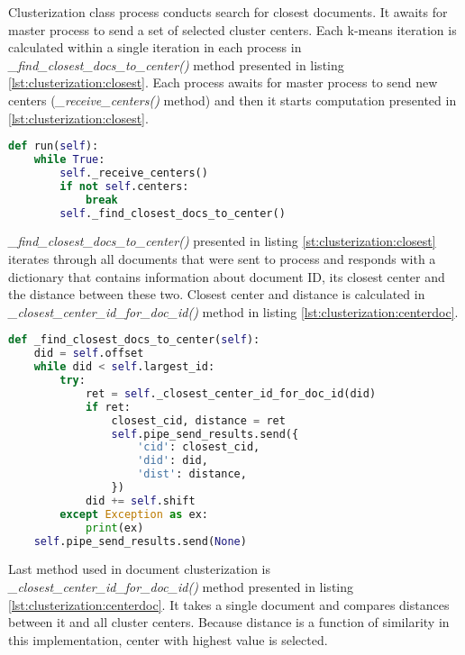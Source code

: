 Clusterization class process conducts search for closest documents. It awaits for master process to send a set of selected cluster centers. Each k-means iteration is calculated within a single iteration in each process in \textit{\_find\_closest\_docs\_to\_center()} method presented in listing \ref{lst:clusterization:closest}. Each process awaits for master process to send new centers (\textit{\_receive\_centers()} method) and then it starts computation presented in \ref{lst:clusterization:closest}.

\begin{lstlisting}[language=Python, caption={Clusterization.run() - Clusterization class process main method}, label={lst:clusterization:run}]
def run(self):
    while True:
        self._receive_centers()
        if not self.centers:
            break
        self._find_closest_docs_to_center()
\end{lstlisting}

\textit{\_find\_closest\_docs\_to\_center()} presented in listing \ref{st:clusterization:closest} iterates through all documents that were sent to process and responds with a dictionary that contains information about document ID, its closest center and the distance between these two. Closest center and distance is calculated in \textit{\_closest\_center\_id\_for\_doc\_id()} method in listing \ref{lst:clusterization:centerdoc}.

\begin{lstlisting}[language=Python, caption={Clusterization.\_find\_closest\_docs\_to\_center() - Finding closest center for a document during clusterization, part 1}, label={lst:clusterization:closest}]
def _find_closest_docs_to_center(self):
    did = self.offset
    while did < self.largest_id:
        try:
            ret = self._closest_center_id_for_doc_id(did)
            if ret:
                closest_cid, distance = ret
                self.pipe_send_results.send({
                    'cid': closest_cid,
                    'did': did,
                    'dist': distance,
                })
            did += self.shift
        except Exception as ex:
            print(ex)
    self.pipe_send_results.send(None)
\end{lstlisting}

Last method used in document clusterization is \textit{ \_closest\_center\_id\_for\_doc\_id()} method presented in listing \ref{lst:clusterization:centerdoc}. It takes a single document and compares distances between it and all cluster centers. Because distance is a function of similarity in this implementation, center with highest value is selected.

